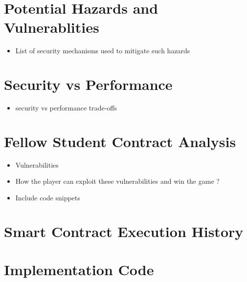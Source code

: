\documentclass[11pt,a4paper]{article}
\begin{document}
\section*{Potential Hazards and Vulnerablities}
\begin{itemize}
        \item List of security mechanisms used to mitigate such hazards
\end{itemize}

\section*{Security vs Performance}
\begin{itemize}
        \item security vs performance trade-offs
\end{itemize}

\section*{Fellow Student Contract Analysis}
\begin{itemize}
        \item Vulnerabilities
        \item How the player can exploit these vulnerabilities and win the game ?
        \item Include code snippets
\end{itemize}

\section*{Smart Contract Execution History}

\section*{Implementation Code}
\end{document}
